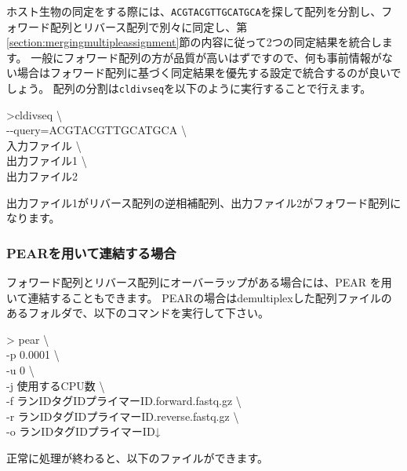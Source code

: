 \documentclass[titlepage,10pt,a4paper]{jsbook}
\newenvironment{cmd}{\begin{oframed}\raggedright\ttfamily\footnotesize\setlength{\baselineskip}{1.4em}}{\end{oframed}\vspace{-1em}}
\begin{document}
ホスト生物の同定をする際には、\texttt{ACGTACGTTGCATGCA}を探して配列を分割し、フォワード配列とリバース配列で別々に同定し、第\ref{section:mergingmultipleassignment}節の内容に従って2つの同定結果を統合します。
一般にフォワード配列の方が品質が高いはずですので、何も事前情報がない場合はフォワード配列に基づく同定結果を優先する設定で統合するのが良いでしょう。
配列の分割は\texttt{cldivseq}を以下のように実行することで行えます。

\begin{cmd}
{\textgreater}cldivseq {\textbackslash}\\
{-}{-}query=ACGTACGTTGCATGCA {\textbackslash}\\
入力ファイル {\textbackslash}\\
出力ファイル1 {\textbackslash}\\
出力ファイル2
\end{cmd}

出力ファイル1がリバース配列の逆相補配列、出力ファイル2がフォワード配列になります。

\subsubsection{PEARを用いて連結する場合}

フォワード配列とリバース配列にオーバーラップがある場合には、PEAR \citep{Zhang2014}を用いて連結することもできます。
PEARの場合はdemultiplexした配列ファイルのあるフォルダで、以下のコマンドを実行して下さい。

\begin{cmd}
{\textgreater} pear {\textbackslash}\\
-p 0.0001 {\textbackslash}\\
-u 0 {\textbackslash}\\
-j 使用するCPU数 {\textbackslash}\\
-f ランID{\textunderscore}{\textunderscore}タグID{\textunderscore}{\textunderscore}プライマーID.forward.fastq.gz {\textbackslash}\\
-r ランID{\textunderscore}{\textunderscore}タグID{\textunderscore}{\textunderscore}プライマーID.reverse.fastq.gz {\textbackslash}\\
-o ランID{\textunderscore}{\textunderscore}タグID{\textunderscore}{\textunderscore}プライマーID↓
\end{cmd}

正常に処理が終わると、以下のファイルができます。
\end{document}
